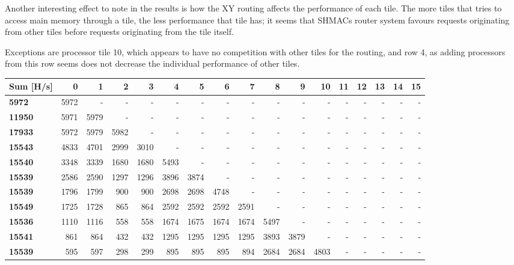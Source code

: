 \begin{appendix}
Another interesting effect to note in the results is how the XY routing affects the performance
of each tile. The more tiles that tries to access main memory through a tile, the less
performance that tile has; it seems that SHMACs router system favours requests originating
from other tiles before requests originating from the tile itself.

Exceptions are processor tile 10, which appears to have no competition with other tiles for the routing, and row 4, as adding processors from this row seems does not decrease the individual performance of other tiles. 

\begin{table}
\begin{tabular}{| l || r r r r | r r r r | r r r | r r r r r |}
  \hline 
  \textbf{Sum} [H/s] & \textbf{0} & \textbf{1} & \textbf{2} & \textbf{3} & \textbf{4} & \textbf{5} & \textbf{6} & \textbf{7} & \textbf{8} & \textbf{9} & \textbf{10} & \textbf{11} & \textbf{12} & \textbf{13} & \textbf{14} & \textbf{15}   \\
  \hline                       
  \textbf{5972} & 5972 & - & - & - & - & - & - & - & - & - & - & - & - & - & - & - \\
  \textbf{11950} & 5971 & 5979 & - & - & - & - & - & - & - & - & - & - & - & - & - & - \\
  \textbf{17933} & 5972 & 5979 & 5982 & - & - & - & - & - & - & - & - & - & - & - & - & - \\
  \textbf{15543} & 4833 & 4701 & 2999 & 3010 & - & - & - & - & - & - & - & - & - & - & - & - \\
  \textbf{15540} & 3348 & 3339 & 1680 & 1680 & 5493 & - & - & - & - & - & - & - & - & - & - & - \\
  \textbf{15539} & 2586 & 2590 & 1297 & 1296 & 3896 & 3874 & - & - & - & - & - & - & - & - & - & - \\
  \textbf{15539} & 1796 & 1799 & 900 & 900 & 2698 & 2698 & 4748 & - & - & - & - & - & - & - & - & - \\
  \textbf{15549} & 1725 & 1728 & 865 & 864 & 2592 & 2592 & 2592 & 2591 & - & - & - & - & - & - & - & -\\
  \textbf{15536} & 1110 & 1116 & 558 & 558 & 1674 & 1675 & 1674 & 1674 & 5497 & - & - & - & - & - & - & -\\
  \textbf{15541} & 861 & 864 & 432 & 432 & 1295 & 1295 & 1295 & 1295 & 3893 & 3879 & - & - & - & - & - & -\\
  \textbf{15539} & 595 & 597 & 298 & 299 & 895 & 895 & 895 & 894 & 2684 & 2684 & 4803 & - & - & - & - & -\\

\end{tabular}
\end{table}
\end{appendix}
